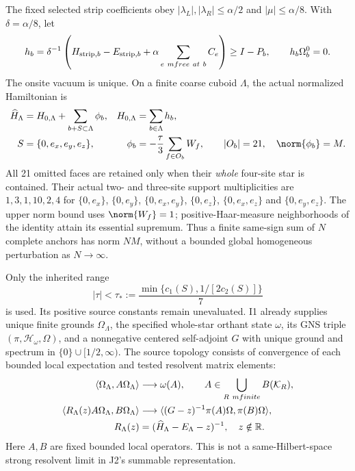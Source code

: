 The fixed selected strip coefficients obey $|\lambda_L|,|\lambda_R|\le\alpha/2$ and $|\mu|\le\alpha/8$. With $\delta=\alpha/8$, let
\begin{equation}
 h_b=\delta^{-1}\left(H_{{\rm strip},b}-E_{{\rm strip},b}
                   +\alpha\sum_{e\ {
m free\ at}\ b}C_e\right)
 \ge I-P_b,\qquad h_b\Omega_b^0=0.
 \label{r28:eq:aj1-site}
\end{equation}
The onsite vacuum is unique. On a finite coarse cuboid $\Lambda$, the actual normalized Hamiltonian is
\begin{align}
 \widehat H_\Lambda&=H_{0,\Lambda}
       +\sum_{b+S\subset\Lambda}\phi_b,
 &H_{0,\Lambda}&=\sum_{b\in\Lambda}h_b,\notag\\
 S&=\{0,e_x,e_y,e_z\},
 &\phi_b&=-\frac\tau3\sum_{f\in O_b}W_f,
 \qquad |O_b|=21,\quad\norm{\phi_b}=M.
 \label{r28:eq:aj1-model}
\end{align}
All 21 omitted faces are retained only when their \emph{whole} four-site star is contained. Their actual two- and three-site support multiplicities are $1,3,1,10,2,4$ for $\{0,e_x\}$, $\{0,e_y\}$, $\{0,e_x,e_y\}$, $\{0,e_z\}$, $\{0,e_x,e_z\}$ and $\{0,e_y,e_z\}$. The upper norm bound uses $\norm{W_f}=1$; positive-Haar-measure neighborhoods of the identity attain its essential supremum. Thus a finite same-sign sum of $N$ complete anchors has norm $NM$, without a bounded global homogeneous perturbation as $N\to\infty$.

Only the inherited range
\begin{equation}
 |\tau|<\tau_*:=\frac{\min\{c_1(S),1/[2c_2(S)]\}}7
 \label{r28:eq:aj1-range}
\end{equation}
is used. Its positive source constants remain unevaluated. I1 already supplies unique finite grounds $\Omega_\Lambda$, the specified whole-star orthant state $\omega$, its GNS triple $(\pi,\mathcal H_\omega,\Omega)$, and a nonnegative centered self-adjoint $G$ with unique ground and spectrum in $\{0\}\cup[1/2,\infty)$. The source topology consists of convergence of each bounded local expectation and tested resolvent matrix elements:
\begin{align}
 \langle\Omega_\Lambda,A\Omega_\Lambda\rangle&\longrightarrow\omega(A),
 \qquad A\in\bigcup_{R\ {
m finite}}B(\mathcal K_R),\notag\\
 \langle R_\Lambda(z)A\Omega_\Lambda,B\Omega_\Lambda\rangle
 &\longrightarrow
 \langle(G-z)^{-1}\pi(A)\Omega,\pi(B)\Omega\rangle,\notag\\
 R_\Lambda(z)&=(\widehat H_\Lambda-E_\Lambda-z)^{-1},\quad z\notin\mathbb R.
 \label{r28:eq:aj1-tested}
\end{align}
Here $A,B$ are fixed bounded local operators. This is not a same-Hilbert-space strong resolvent limit in J2's summable representation.

